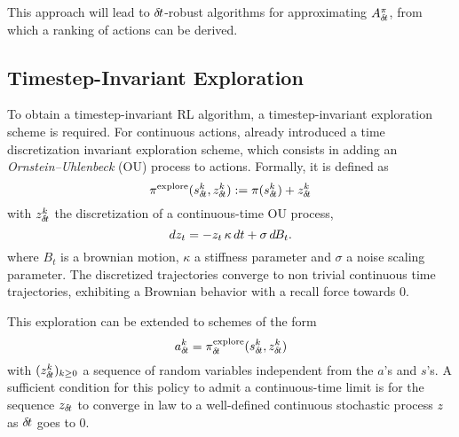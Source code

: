 This approach will lead to ${\delta\hspace{-.1em}t}$-robust algorithms for
approximating $A^\pi_{\delta\hspace{-.1em}t}$, from which a ranking of actions can be
derived.

\subsection{Timestep-Invariant Exploration}
\label{subsec:explo}

To obtain a timestep-invariant RL algorithm, a timestep-invariant
exploration scheme is required. 
For continuous actions, \cite{ddpg} already introduced a time discretization invariant exploration scheme, which consists in adding an
\emph{Ornstein--Uhlenbeck} \cite{orn-uhl} (OU) process to actions. Formally, it is defined as
\begin{equation}
	\pi^\text{explore}(s^k_{\delta\hspace{-.1em}t}, z^k_{\delta\hspace{-.1em}t}) \mathrel{\mathop{:}}= \pi(s^k_{\delta\hspace{-.1em}t}) + z^k_{\delta\hspace{-.1em}t}
\end{equation}
with $z^k_{\delta\hspace{-.1em}t}$ the discretization of a continuous-time OU process,
\begin{equation}
	dz_t = - z_t \,\kappa\, dt + \sigma \,d\hspace{-.1em}B_t.
	\label{eq:orn_uhl}
\end{equation}
where $B_t$ is a brownian motion, $\kappa$ a stiffness parameter and
$\sigma$ a noise scaling parameter. The discretized trajectories converge
to non trivial continuous time trajectories, exhibiting a Brownian
behavior with a recall force towards $0$.

This exploration can be extended to schemes of the form
\begin{equation}
  \label{eq:explore}
	a^k_{\delta\hspace{-.1em}t} = \pi^\text{explore}_{\delta\hspace{-.1em}t}(s^k_{\delta\hspace{-.1em}t}, z^k_{\delta\hspace{-.1em}t})
\end{equation}
with $(z^k_{\delta\hspace{-.1em}t})_{k\geq 0}$ a sequence of random variables independent from the $a$'s and $s$'s.
A sufficient condition for this policy to admit a continuous-time
limit is for the sequence
$z_{\delta\hspace{-.1em}t}$ to converge in law to a
well-defined continuous stochastic process $z$ as ${\delta\hspace{-.1em}t}$ goes to $0$.

